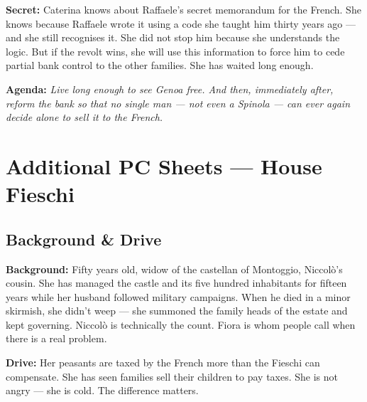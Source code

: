 \clearpage
\begin{secretbox}
\textbf{Secret:} Caterina knows about Raffaele's secret memorandum for the French.
She knows because Raffaele wrote it using a code she taught him thirty years ago ---
and she still recognises it. She did not stop him because she understands the logic.
But if the revolt wins, she will use this information to force him to cede partial
bank control to the other families. She has waited long enough.

\medskip\noindent\textcolor{SecretRed}{\textbf{Agenda:}}
\textit{Live long enough to see Genoa free. And then, immediately after, reform the
bank so that no single man --- not even a Spinola --- can ever again decide alone
to sell it to the French.}
\end{secretbox}

\clearpage


\chapter{Additional PC Sheets --- House Fieschi}


\section*{Background \& Drive}
\begin{rulebox}{}
\textbf{Background:} Fifty years old, widow of the castellan of Montoggio, Niccol\`o's
cousin. She has managed the castle and its five hundred inhabitants for fifteen years
while her husband followed military campaigns. When he died in a minor skirmish, she
didn't weep --- she summoned the family heads of the estate and kept governing.
Niccol\`o is technically the count. Fiora is whom people call when there is a real problem.

\medskip\noindent\textcolor{FieschiGreen}{\textbf{Drive:}} Her peasants are taxed
by the French more than the Fieschi can compensate. She has seen families sell
their children to pay taxes. She is not angry --- she is cold.
The difference matters.
\end{rulebox}

